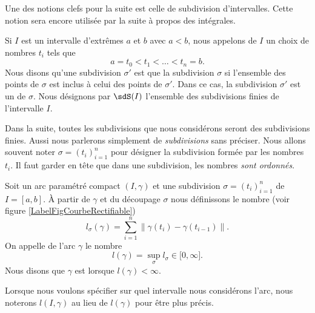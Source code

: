 Une des notions clefs pour la suite est celle de subdivision d'intervalles. Cette notion sera encore utilisée par la suite à propos des intégrales.
\begin{definition}      \label{DefSubdivisionIntervalle}
    Si $I$ est un intervalle d'extrêmes $a$ et $b$ avec $a<b$, nous appelons  de $I$ un choix de nombres $t_i$ tels que
    \begin{equation}
        a=t_0<t_1<\ldots<t_n=b.
    \end{equation}
    Nous disons qu'une subdivision $\sigma'$ est  que la subdivision $\sigma$ si l'ensemble des points de $\sigma$ est inclus à celui des points de $\sigma'$. Dans ce cas, la subdivision $\sigma'$ est un  de $\sigma$. Nous désignons par $\sdS(I)$ l'ensemble des subdivisions finies de l'intervalle $I$.
\end{definition}
Dans la suite, toutes les subdivisions que nous considérons seront des subdivisions finies. Aussi nous parlerons simplement de \emph{subdivisions} sans préciser. Nous allons souvent noter $\sigma=(t_i)_{i=1}^n$ pour désigner la subdivision formée par les nombres $t_i$. Il faut garder en tête que dans une subdivision, les nombres \emph{sont ordonnés}.

\newcommand{\CaptionFigCourbeRectifiable}{La longueur d'un découpage. La somme des longueurs des segments droits est facile à calculer.}

\begin{definition}
    
    Soit un arc paramétré compact $(I,\gamma)$ et une subdivision $\sigma=(t_i)_{i=1}^n$ de $I=[a,b]$. À partir de $\gamma$ et du découpage $\sigma$ nous définissons le nombre (voir figure \ref{LabelFigCourbeRectifiable})
    \begin{equation}        \label{Eqlsigmagammasss}
        l_{\sigma}(\gamma)=\sum_{i=1}^n\big\| \gamma(t_i)-\gamma(t_{i-1}) \big\|.
    \end{equation}
    On appelle  de l'arc $\gamma$ le nombre
    \begin{equation}
        l(\gamma)=\sup_{\sigma}l_{\sigma}\in\mathopen[ 0 , \infty \mathclose].
    \end{equation}
    Nous disons que $\gamma$ est  lorsque $l(\gamma)<\infty$.
\end{definition}
Lorsque nous voulons spécifier sur quel intervalle nous considérons l'arc, nous noterons $l(I,\gamma)$ au lieu de $l(\gamma)$ pour être plus précis.

